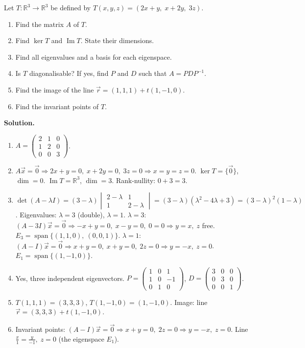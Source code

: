 \documentclass[11pt]{article}
\begin{document}
\begin{exercice}
Let $T:\mathbb{R}^3\to\mathbb{R}^3$ be defined by $T(x,y,z)=(2x+y,\;x+2y,\;3z)$.
\begin{enumerate}
\item Find the matrix $A$ of $T$.
\item Find $\ker T$ and $\operatorname{Im} T$. State their dimensions.
\item Find all eigenvalues and a basis for each eigenspace.
\item Is $T$ diagonalisable? If yes, find $P$ and $D$ such that $A=PDP^{-1}$.
\item Find the image of the line $\vec{r}=(1,1,1)+t(1,-1,0)$.
\item Find the invariant points of $T$.
\end{enumerate}
\end{exercice}

\begin{corrige}[Exercise 3]
\textbf{Solution.}
\begin{enumerate}
\item $A=\begin{pmatrix} 2 & 1 & 0 \\ 1 & 2 & 0 \\ 0 & 0 & 3 \end{pmatrix}$.
\item $A\vec{x}=\vec{0}\Rightarrow 2x+y=0,\;x+2y=0,\;3z=0\Rightarrow x=y=z=0$. $\ker T=\{\vec{0}\}$, $\dim=0$. $\operatorname{Im} T=\mathbb{R}^3$, $\dim=3$. Rank-nullity: $0+3=3$.
\item $\det(A-\lambda I)=(3-\lambda)\begin{vmatrix}2-\lambda&1\\1&2-\lambda\end{vmatrix}=(3-\lambda)(\lambda^2-4\lambda+3)=(3-\lambda)^2(1-\lambda)$.
Eigenvalues: $\lambda=3$ (double), $\lambda=1$.
$\lambda=3$: $(A-3I)\vec{x}=\vec{0}\Rightarrow -x+y=0,\;x-y=0,\;0=0\Rightarrow y=x,\;z$ free. $E_3=\operatorname{span}\{(1,1,0),\ (0,0,1)\}$.
$\lambda=1$: $(A-I)\vec{x}=\vec{0}\Rightarrow x+y=0,\;x+y=0,\;2z=0\Rightarrow y=-x,\;z=0$. $E_1=\operatorname{span}\{(1,-1,0)\}$.
\item Yes, three independent eigenvectors. $P=\begin{pmatrix}1&0&1\\1&0&-1\\0&1&0\end{pmatrix}$, $D=\begin{pmatrix}3&0&0\\0&3&0\\0&0&1\end{pmatrix}$.
\item $T(1,1,1)=(3,3,3)$, $T(1,-1,0)=(1,-1,0)$. Image: line $\vec{r}=(3,3,3)+t(1,-1,0)$.
\item Invariant points: $(A-I)\vec{x}=\vec{0}\Rightarrow x+y=0,\;2z=0\Rightarrow y=-x,\;z=0$. Line $\frac{x}{1}=\frac{y}{-1},\;z=0$ (the eigenspace $E_1$).
\end{enumerate}
\end{corrige}
\end{document}
